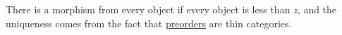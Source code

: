 There is a morphism from every object if every object is less than \emph{z}, and the uniqueness comes from the fact that \hyperref[D1.30]{preorders} are thin categories.
